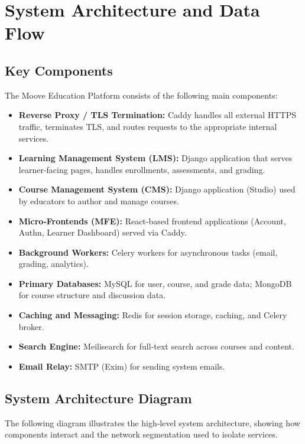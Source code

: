 \section{System Architecture and Data Flow}

\subsection{Key Components}
The Moove Education Platform consists of the following main components:
\begin{itemize}
    \item \textbf{Reverse Proxy / TLS Termination:} Caddy handles all external HTTPS traffic, terminates TLS, and routes requests to the appropriate internal services.
    \item \textbf{Learning Management System (LMS):} Django application that serves learner‑facing pages, handles enrollments, assessments, and grading.
    \item \textbf{Course Management System (CMS):} Django application (Studio) used by educators to author and manage courses.
    \item \textbf{Micro‑Frontends (MFE):} React‑based frontend applications (Account, Authn, Learner Dashboard) served via Caddy.
    \item \textbf{Background Workers:} Celery workers for asynchronous tasks (email, grading, analytics).
    \item \textbf{Primary Databases:} MySQL for user, course, and grade data; MongoDB for course structure and discussion data.
    \item \textbf{Caching and Messaging:} Redis for session storage, caching, and Celery broker.
    \item \textbf{Search Engine:} Meilisearch for full‑text search across courses and content.
    \item \textbf{Email Relay:} SMTP (Exim) for sending system emails.
\end{itemize}

\subsection{System Architecture Diagram}
The following diagram illustrates the high‑level system architecture, showing how components interact and the network segmentation used to isolate services.

